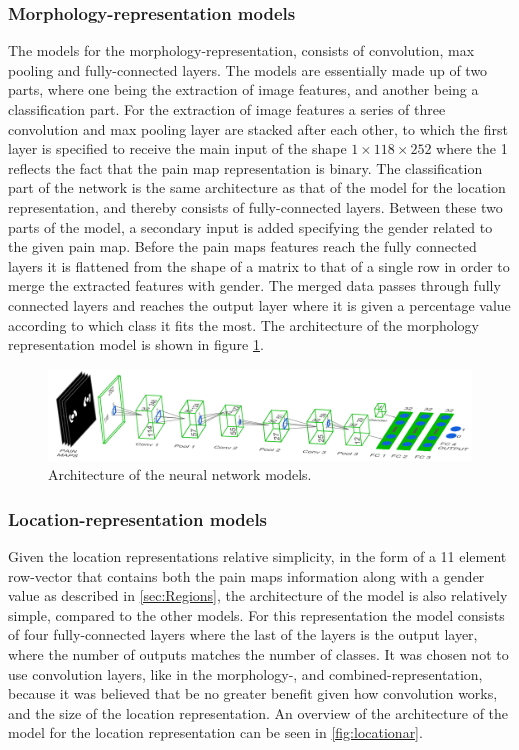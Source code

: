 \subsubsection{Morphology-representation models}
The models for the morphology-representation, consists of convolution, max pooling and fully-connected layers.  
The models are essentially made up of two parts, where one being the extraction of image features, and another being a classification part. 
For the extraction of image features a series of three convolution and max pooling layer are stacked after each other, to which the first layer is specified to receive the main input of the shape $1 \times 118 \times 252$ where the 1 reflects the fact that the pain map representation is binary. 
The classification part of the network is the same architecture as that of the model for the location representation, and thereby consists of fully-connected layers. Between these two parts of the model, a secondary input is added specifying the gender related to the given pain map. 
Before the pain maps features reach the fully connected layers it is flattened from the shape of a matrix to that of a single row in order to merge the extracted features with gender. The merged data passes through fully connected layers and reaches the output layer where it is given a percentage value according to which class it fits the most. 
The architecture of the morphology representation model is shown in figure \ref{fig:Schema1}.

\begin{figure} [H]
\centering
\includegraphics[width=1.0\textwidth]{figures/models}
\caption{Architecture of the neural network models.}
\label{fig:Schema1} 
\end{figure}


\subsubsection{Location-representation models}
Given the location representations relative simplicity, in the form of a 11 element row-vector that contains both the pain maps information along with a gender value as described in \ref{sec:Regions}, the architecture of the model is also relatively simple, compared to the other models.  
For this representation the model consists of four fully-connected layers where the last of the layers is the output layer, where the number of outputs matches the number of classes. 
It was chosen not to use convolution layers, like in the morphology-, and combined-representation, because it was believed that be no greater benefit given how convolution works, and the size of the location representation. 
An overview of the architecture of the model for the location representation can be seen in \ref{fig:locationar}.

